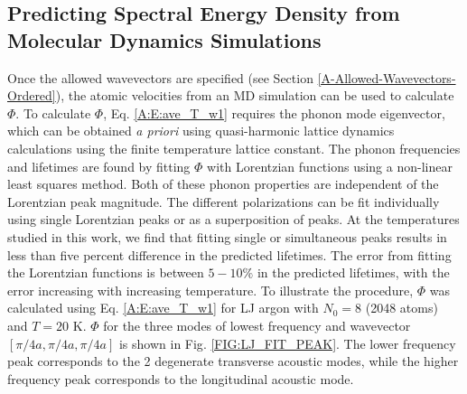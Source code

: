 \documentclass[letterpaper,12pt]{article}
\begin{document}
\subsection{\label{A-SED-MD}Predicting Spectral Energy Density from Molecular Dynamics Simulations}
Once the allowed wavevectors are specified (see Section \ref{A-Allowed-Wavevectors-Ordered}), the atomic velocities from an MD simulation can be used to calculate $\Phi$. To calculate $\Phi$, Eq$.$ \eqref{A:E:ave_T_w1} requires the phonon mode eigenvector, which can be obtained {\em a priori} using quasi-harmonic lattice dynamics calculations using the finite temperature lattice constant.\cite{mcgaughey2006b} The phonon frequencies and lifetimes are found by fitting $\Phi$ with Lorentzian functions using a non-linear least squares method. Both of these phonon properties are independent of the Lorentzian peak magnitude. The different polarizations can be fit individually using single Lorentzian peaks or as a superposition of peaks. At the temperatures studied in this work, we find that fitting single or simultaneous peaks results in less than five percent difference in the predicted lifetimes. The error from fitting the Lorentzian functions is between $5-10\%$ in the predicted lifetimes, with the error increasing with increasing temperature.\footnotemark 
To illustrate the procedure, $\Phi$ was calculated using Eq$.$ \eqref{A:E:ave_T_w1} for LJ argon with $N_0=8$ (2048 atoms) and $T=20$ K. $\Phi$ for the three modes of lowest frequency and wavevector $[\pi/4a,\pi/4a,\pi/4a]$ is shown in Fig$.$ \ref{FIG:LJ_FIT_PEAK}. The lower frequency peak corresponds to the 2 degenerate transverse acoustic modes, while the higher frequency peak corresponds to the longitudinal acoustic mode.\cite{dove1993}
\end{document}
